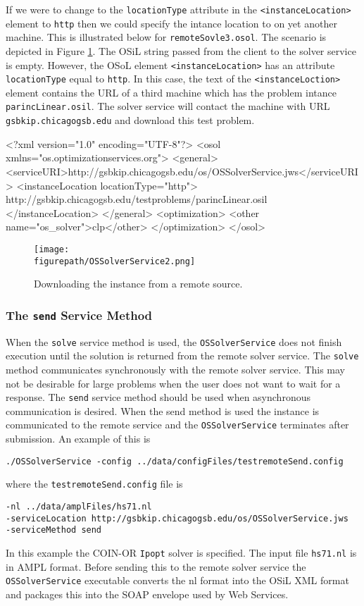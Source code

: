 \documentclass[11pt]{article}
\newcommand{\figurepath}{./figures}
\newcounter{Fig}
\renewcommand{\_}{{\char"5F}}
\renewcommand{\{}{{\char"7B}}
\renewcommand{\}}{{\char"7D}}
\renewcommand{\^}{{\char"0D}}
\renewcommand{\'}{{\char"0D}}
\begin{document}
If we were to change to the {\tt locationType} attribute in the {\tt <instanceLocation>} element to {\tt http} then we could specify the intance location to on yet another machine. This is illustrated below  for {\tt remoteSovle3.osol}.  The scenario is depicted in Figure \ref{figure:ossolverservice2}.  The OSiL string passed from the client to the solver service is empty.  However, the OSoL element {\tt <instanceLocation>}  has an attribute {\tt locationType} equal to   {\tt http}.  In this case, the text of the {\tt <instanceLoction>} element contains the URL of a third machine which has the problem intance {\tt parincLinear.osil}.  The solver service will contact the machine with URL {\tt gsbkip.chicagogsb.edu} and download this test problem.
\begin{verbatimtab}[4]
<?xml version="1.0" encoding="UTF-8"?>
<osol xmlns="os.optimizationservices.org">
    <general>
        <serviceURI>http://gsbkip.chicagogsb.edu/os/OSSolverService.jws</serviceURI>
         <instanceLocation locationType="http">
	 http://gsbkip.chicagogsb.edu/testproblems/parincLinear.osil
	 </instanceLocation>
    </general>
    <optimization>
    	<other name="os_solver">clp</other>
    </optimization>
</osol>
\end{verbatimtab}

\begin{figure}
\centering
\texttt{[image: \\figurepath/OSSolverService2.png]}
\caption{Downloading the instance from a remote source.}
\label{figure:ossolverservice2}
\end{figure}

\subsubsection{The  {\tt send} Service Method}\label{section:send}

When the {\tt solve} service method is used, the {\tt OSSolverService} does not finish execution until the solution is returned from the remote solver service. The {\tt solve} method communicates synchronously with the remote solver service. This may not be desirable for large problems when the user does not want to wait for a response. The {\tt send} service method should be used when asynchronous communication is desired. When the send method is used the instance is communicated to the remote service and the {\tt OSSolverService} terminates after submission. An example of this is
\begin{verbatim}
./OSSolverService -config ../data/configFiles/testremoteSend.config
\end{verbatim}
where the {\tt testremoteSend.config} file is
\begin{verbatim}
-nl ../data/amplFiles/hs71.nl
-serviceLocation http://gsbkip.chicagogsb.edu/os/OSSolverService.jws
-serviceMethod send
\end{verbatim}
In this example the COIN-OR {\tt Ipopt} solver is specified. The input file {\tt hs71.nl} is in AMPL format. Before sending this to the remote solver service the {\tt OSSolverService} executable converts  the nl format into the OSiL XML format and packages this into the SOAP envelope used by Web Services.
\end{document}
